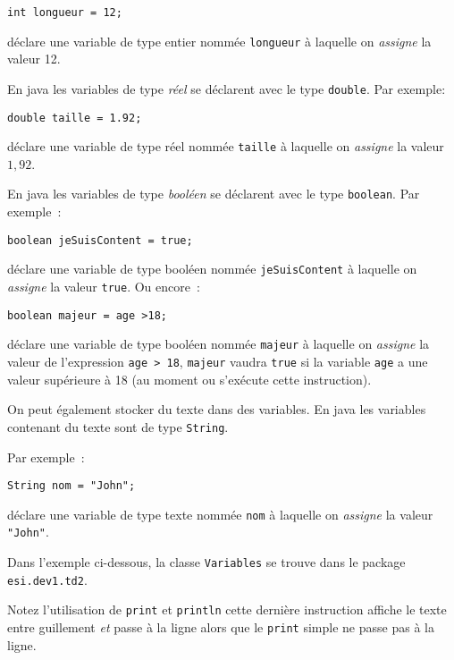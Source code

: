 \documentclass[a4paper,11pt]{article}
\begin{document}
	\texttt{int longueur = 12;}
	
	déclare une variable de type entier nommée \texttt{longueur} à laquelle on \emph{assigne}
	la valeur 12.
	
	En java les variables de type \emph{réel}  se déclarent avec le type \texttt{double}. 
	Par exemple:
	
	\texttt{double taille = 1.92;}
	
	déclare une variable de type réel nommée \texttt{taille} à laquelle on \emph{assigne}
	la valeur $1,92$.

	En java les variables de type \emph{booléen}  se déclarent avec le type \texttt{boolean}. 
	Par exemple~:
	
	\texttt{boolean jeSuisContent = true;}

	déclare une variable de type booléen nommée \texttt{jeSuisContent} à laquelle on \emph{assigne}
	la valeur \texttt{true}. Ou encore~: 
	
	\texttt{boolean majeur = age >18;}
	
	déclare une variable de type booléen nommée \texttt{majeur} à laquelle on \emph{assigne}
	la valeur de l'expression \texttt{age > 18}, \texttt{majeur} vaudra \texttt{true} si la variable \texttt{age} 
	a une valeur supérieure à 18 (au moment ou s'exécute cette instruction). 

	On peut également stocker du texte dans des variables.
	En java les variables contenant du texte sont de type \texttt{String}.
	 
	Par exemple~:

	\texttt{String nom = "John";}

	déclare une variable de type texte nommée \texttt{nom} à laquelle on \emph{assigne}
	la valeur \texttt{"John"}.


	Dans l'exemple ci-dessous, la classe \texttt{Variables} se trouve dans le package 
	\texttt{esi.dev1.td2}.

	

	Notez l'utilisation de \texttt{print} et \texttt{println} cette dernière instruction affiche 
	le texte entre guillement
	\emph{et} passe à la ligne alors que le \texttt{print} simple ne passe pas à la ligne. 



	
	
\end{document}
